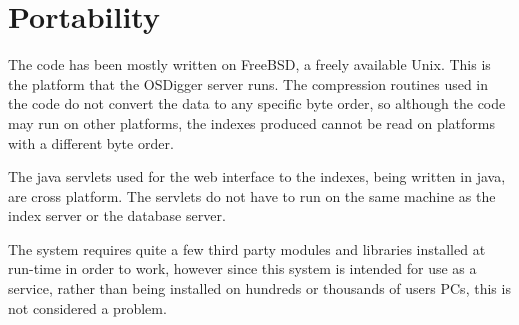 \section{Portability}
The code has been mostly written on FreeBSD, a freely available Unix.  This is the platform that the OSDigger server runs.  The compression routines used in the code do not convert the data to any specific byte order, so although the code may run on other platforms, the indexes produced cannot be read on platforms with a different byte order.

The java servlets used for the web interface to the indexes, being written in java, are cross platform.  The servlets do not have to run on the same machine as the index server or the database server.

The system requires quite a few third party modules and libraries installed at run-time in order to work, however since this system is intended for use as a service, rather than being installed on hundreds or thousands of users PCs, this is not considered a problem.

